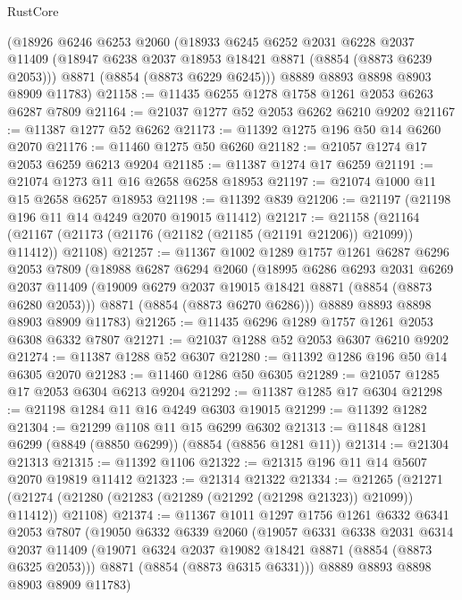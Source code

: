 \begin{lexlean}{RustCore}
\begin{coremodule}
    (@18926
      @6246
      @6253
      @2060
      (@18933
        @6245
        @6252
        @2031
        @6228
        @2037
        @11409
        (@18947 @6238 @2037 @18953 @18421 @8871 (@8854 (@8873 @6239 @2053)))
        @8871
        (@8854 (@8873 @6229 @6245)))
      @8889
      @8893
      @8898
      @8903
      @8909
      @11783)
@21158 := @11435 @6255 @1278 @1758 @1261 @2053 @6263 @6287 @7809
@21164 := @21037 @1277 @52 @2053 @6262 @6210 @9202
@21167 := @11387 @1277 @52 @6262
@21173 := @11392 @1275 @196 @50 @14 @6260 @2070
@21176 := @11460 @1275 @50 @6260
@21182 := @21057 @1274 @17 @2053 @6259 @6213 @9204
@21185 := @11387 @1274 @17 @6259
@21191 := @21074 @1273 @11 @16 @2658 @6258 @18953
@21197 := @21074 @1000 @11 @15 @2658 @6257 @18953
@21198 := @11392 @839
@21206 := @21197 (@21198 @196 @11 @14 @4249 @2070 @19015 @11412)
@21217 := @21158
    (@21164 (@21167 (@21173 (@21176 (@21182 (@21185 (@21191 @21206)) @21099)) @11412)) @21108)
@21257 := @11367
    @1002
    @1289
    @1757
    @1261
    @6287
    @6296
    @2053
    @7809
    (@18988
      @6287
      @6294
      @2060
      (@18995
        @6286
        @6293
        @2031
        @6269
        @2037
        @11409
        (@19009 @6279 @2037 @19015 @18421 @8871 (@8854 (@8873 @6280 @2053)))
        @8871
        (@8854 (@8873 @6270 @6286)))
      @8889
      @8893
      @8898
      @8903
      @8909
      @11783)
@21265 := @11435 @6296 @1289 @1757 @1261 @2053 @6308 @6332 @7807
@21271 := @21037 @1288 @52 @2053 @6307 @6210 @9202
@21274 := @11387 @1288 @52 @6307
@21280 := @11392 @1286 @196 @50 @14 @6305 @2070
@21283 := @11460 @1286 @50 @6305
@21289 := @21057 @1285 @17 @2053 @6304 @6213 @9204
@21292 := @11387 @1285 @17 @6304
@21298 := @21198 @1284 @11 @16 @4249 @6303 @19015
@21299 := @11392 @1282
@21304 := @21299 @1108 @11 @15 @6299 @6302
@21313 := @11848 @1281 @6299 (@8849 (@8850 @6299)) (@8854 (@8856 @1281 @11))
@21314 := @21304 @21313
@21315 := @11392 @1106
@21322 := @21315 @196 @11 @14 @5607 @2070 @19819 @11412
@21323 := @21314 @21322
@21334 := @21265
    (@21271 (@21274 (@21280 (@21283 (@21289 (@21292 (@21298 @21323)) @21099)) @11412)) @21108)
@21374 := @11367
    @1011
    @1297
    @1756
    @1261
    @6332
    @6341
    @2053
    @7807
    (@19050
      @6332
      @6339
      @2060
      (@19057
        @6331
        @6338
        @2031
        @6314
        @2037
        @11409
        (@19071 @6324 @2037 @19082 @18421 @8871 (@8854 (@8873 @6325 @2053)))
        @8871
        (@8854 (@8873 @6315 @6331)))
      @8889
      @8893
      @8898
      @8903
      @8909
      @11783)

\end{coremodule}
\end{lexlean}
